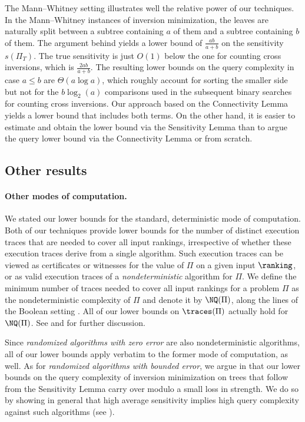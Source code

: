The Mann--Whitney setting illustrates well the relative power of our techniques. In the Mann--Whitney instances of inversion minimization, the leaves are naturally split between a subtree containing $a$ of them and a subtree containing $b$ of them. The argument behind  yields a lower bound of $\frac{ab}{a+b}$ on the sensitivity $s(\Pi_T)$. The true sensitivity is just $O(1)$ below the one for counting cross inversions, which is $\frac{2ab}{a+b}$. The resulting lower bounds on the query complexity in case $a \le b$ are $\Theta(a \log a)$, which roughly account for sorting the smaller side but not for the $b \log_2(a)$ comparisons used in the subsequent binary searches for counting cross inversions. Our approach based on the Connectivity Lemma yields a lower bound that includes both terms. On the other hand, it is easier to estimate and obtain the lower bound via the Sensitivity Lemma than to argue the query lower bound via the Connectivity Lemma or from scratch. 

\subsection{Other results}
%

\paragraph{Other modes of computation.}
We stated our lower bounds for the standard, deterministic mode of computation. Both of our techniques provide lower bounds for the number of distinct execution traces that are needed to cover all input rankings, irrespective of whether these execution traces derive from a single algorithm. Such execution traces can be viewed as certificates or witnesses for the value of $\Pi$ on a given input $\ranking$, or as valid execution traces of a \emph{nondeterministic} algorithm for $\Pi$. We define the minimum number of traces needed to cover all input rankings for a problem $\Pi$ as the nondeterministic complexity of $\Pi$ and denote it by $\NQ(\Pi)$, along the lines of the Boolean setting \cite{JRSW99}. All of our lower bounds on $\traces(\Pi)$ actually hold for $\NQ(\Pi)$. See  and  for further discussion.

Since \emph{randomized algorithms with zero error} are also nondeterministic algorithms, all of our lower bounds apply verbatim to the former mode of computation, as well. As for \emph{randomized algorithms with bounded error}, we argue in  that our lower bounds on the query complexity of inversion minimization on trees that follow from the Sensitivity Lemma carry over modulo a small loss in strength. We do so by showing in general %
%
%
that high average sensitivity implies high query complexity against such algorithms (see ).

